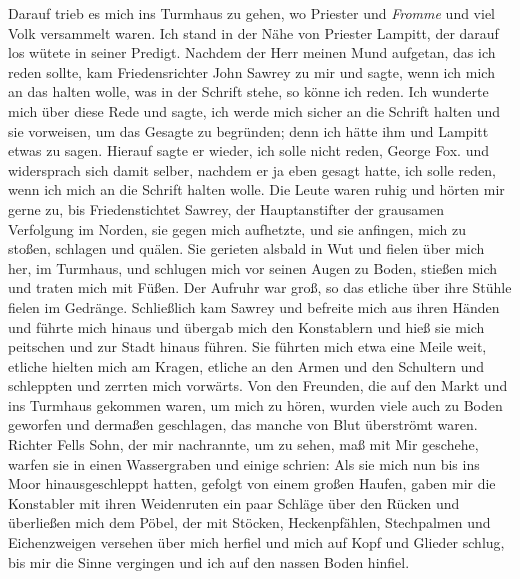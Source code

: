 Darauf trieb es mich ins Turmhaus zu gehen, wo Priester
und \textit{Fromme} und viel Volk versammelt waren. Ich stand in der
Nähe von Priester Lampitt, der darauf los wütete in seiner
Predigt. Nachdem der Herr meinen Mund aufgetan, das ich
reden sollte, kam Friedensrichter John 
Sawrey zu mir und sagte,
wenn ich mich an das halten wolle, was in der Schrift stehe,
so könne ich reden. Ich wunderte mich über 
diese Rede und sagte,
ich werde mich sicher an die Schrift halten und sie vorweisen,
um das Gesagte zu begründen; denn ich hätte ihm und Lampitt
etwas zu sagen. Hierauf sagte er wieder, ich solle nicht reden,
George Fox. 
und widersprach sich damit selber, nachdem er ja eben gesagt
hatte, ich solle reden, wenn ich mich an die Schrift halten wolle.
Die Leute waren ruhig und hörten mir gerne zu, bis 
Friedenstichtet Sawrey, der Hauptanstifter der grausamen Verfolgung
im Norden, sie gegen mich aufhetzte, und sie anfingen, mich zu
stoßen, schlagen und quälen. Sie gerieten alsbald in Wut und
fielen über mich her, im Turmhaus, und schlugen mich vor seinen
Augen zu Boden, stießen mich und traten mich mit 
Füßen. Der
Aufruhr war groß, so das etliche über ihre Stühle fielen im
Gedränge. Schließlich kam Sawrey und befreite mich aus ihren
Händen und führte mich hinaus und übergab mich den Konstablern
und hieß sie mich peitschen und zur Stadt hinaus führen. Sie
führten mich etwa eine Meile weit, etliche hielten mich am Kragen,
etliche an den Armen und den Schultern und schleppten und
zerrten mich vorwärts. Von den Freunden, die auf den Markt
und ins Turmhaus gekommen waren, um mich zu hören, wurden
viele auch zu Boden geworfen und dermaßen geschlagen, das
manche von Blut überströmt waren. Richter Fells Sohn, der
mir nachrannte, um zu sehen, maß mit Mir geschehe, warfen sie
in einen Wassergraben und einige schrien:  Als sie mich nun bis ins Moor hinausgeschleppt
hatten, gefolgt von einem großen Haufen, gaben mir die 
Konstabler mit ihren Weidenruten ein paar Schläge über den
Rücken und überließen mich dem Pöbel, der mit Stöcken, 
Heckenpfählen, Stechpalmen und Eichenzweigen versehen über mich
herfiel und mich auf Kopf und Glieder schlug, bis mir die
Sinne vergingen und ich auf den nassen Boden hinfiel. 


